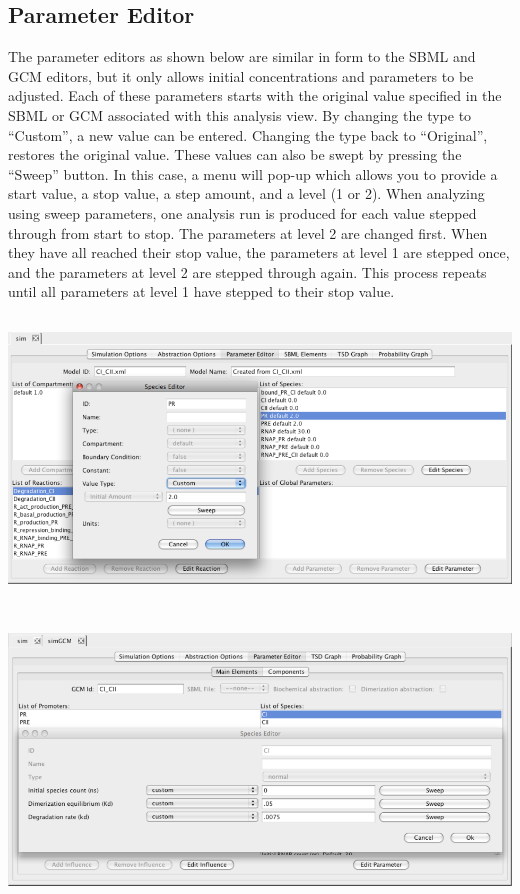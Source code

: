 \documentclass[titlepage,11pt]{article}
\begin{document}
\clearpage

\subsection{\label{paramEdit}Parameter Editor}

\noindent
The parameter editors as shown below are similar in form to the SBML and
GCM editors, but it only allows initial concentrations and parameters to be
adjusted.  Each of these parameters starts with the original value
specified in the SBML or GCM associated with
this analysis view. By changing the type to ``Custom'', a
new value can be entered. Changing the type back to ``Original'',
restores the original value. These values can also be swept by
pressing the ``Sweep'' button. In this case, a menu will pop-up which
allows you to provide a start value, a stop value, a step amount, and a level
(1 or 2).  When analyzing using sweep parameters, one analysis run
is produced for each value stepped through from start to stop.
The parameters at level 2 are changed first. When they have all
reached their stop value, the parameters at level 1 are stepped
once, and the parameters at level 2 are stepped through again.
This process repeats until all parameters at level 1 have stepped
to their stop value. 
\begin{center}
\includegraphics[height=75mm]{screenshots/paramEdit}
\end{center}
\vspace*{0.25in}
\begin{center}
\includegraphics[height=75mm]{screenshots/GCMParamEdit}
\end{center}
\end{document}
